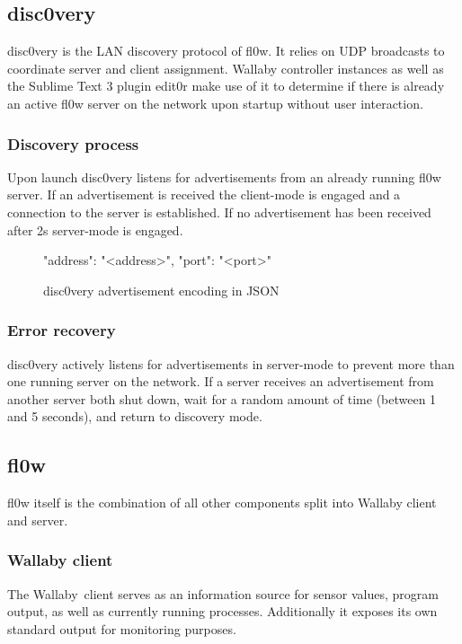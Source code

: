 \documentclass[conference,a4paper]{IEEEtran}
\begin{document}
\subsection{disc0very}
disc0very\cite{disc0very:Christoph Heiss} is the LAN discovery protocol of fl0w. It relies on UDP\cite{UDP:J. Postel} broadcasts to coordinate server and client assignment. Wallaby controller instances as well as the Sublime Text 3 plugin edit0r make use of it to determine if there is already an active fl0w server on the network upon startup without user interaction.


\subsubsection{Discovery process}
Upon launch disc0very listens for advertisements from an already running fl0w server. If an advertisement is received the client-mode is engaged and a connection to the server is established. If no advertisement has been received after 2s server-mode is engaged.

\begin{figure}[H]
\centering
\begin{json}
{
    "address": "<address>",
    "port": "<port>"
}
\end{json}
\caption{disc0very advertisement encoding in JSON\cite{JSON:T. Bray Ed.}}
\label{fig:discovery_advertisement}
\end{figure}

\subsubsection{Error recovery}
disc0very actively listens for advertisements in server-mode to prevent more than one running server on the network. If a server receives an advertisement from another server both shut down, wait for a random amount of time (between 1 and 5 seconds), and return to discovery mode. 


\subsection{fl0w}
fl0w itself is the combination of all other components split into Wallaby client and server.\\

\subsubsection{Wallaby client}
The Wallaby\ client serves as an information source for sensor values, program output, as well as currently running processes. Additionally it exposes its own standard output for monitoring purposes.\\
\end{document}
